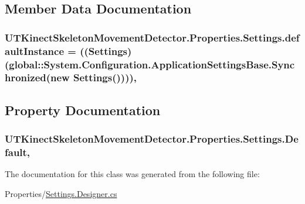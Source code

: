 \subsection{Member Data Documentation}
\hypertarget{classUTKinectSkeletonMovementDetector_1_1Properties_1_1Settings_ae19796fbb92846fa41f12dd457beaa2b}{
\subsubsection[{default\-Instance}]{ U\-T\-Kinect\-Skeleton\-Movement\-Detector.\-Properties.\-Settings.\-default\-Instance = (({\bf Settings})(global\-::\-System.\-Configuration.\-Application\-Settings\-Base.\-Synchronized(new {\bf Settings}())))\hspace{0.3cm}{\ttfamily [static]}, {\ttfamily [private]}}}\label{classUTKinectSkeletonMovementDetector_1_1Properties_1_1Settings_ae19796fbb92846fa41f12dd457beaa2b}


\subsection{Property Documentation}
\hypertarget{classUTKinectSkeletonMovementDetector_1_1Properties_1_1Settings_a0aadb4f47abf4b0b09d34f2f561be8dd}{
\subsubsection[{Default}]{ U\-T\-Kinect\-Skeleton\-Movement\-Detector.\-Properties.\-Settings.\-Default\hspace{0.3cm}{\ttfamily [static]}, {\ttfamily [get]}}}\label{classUTKinectSkeletonMovementDetector_1_1Properties_1_1Settings_a0aadb4f47abf4b0b09d34f2f561be8dd}


The documentation for this class was generated from the following file\-:\begin{DoxyCompactItemize}
\item 
Properties/\hyperlink{Settings_8Designer_8cs}{Settings.\-Designer.\-cs}\end{DoxyCompactItemize}
